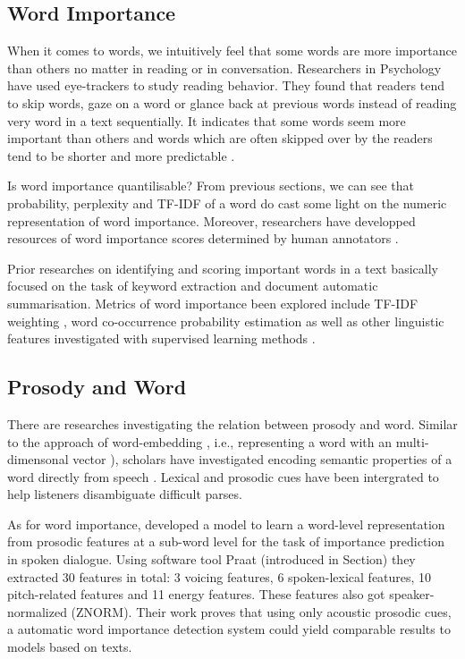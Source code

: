 \subsection{Word Importance}
When it comes to words, we intuitively feel that some words are more importance than others no matter in reading or in conversation. Researchers in Psychology have used eye-trackers to study reading behavior. They found that readers tend to skip words, gaze on a word or glance back at previous words instead of reading very word in a text sequentially. It indicates that some words seem more important than others and words which are often skipped over by the readers tend to be shorter and more predictable \citep{Rayner2011}. 

Is word importance quantilisable? From previous sections, we can see that probability, perplexity and TF-IDF of a word do cast some light on the numeric representation of word importance. Moreover, researchers have developped resources of word importance scores determined by human annotators \citep{Kafle2018}. 
 
Prior researches on identifying and scoring important words in a text basically focused on the task of keyword extraction and document automatic summarisation. Metrics of word importance been explored include TF-IDF weighting \citep{HaCohen-Kerner2010}, word co-occurrence probability estimation \citep{Y.MATSUO2004} as well as other linguistic features investigated with supervised learning methods \citep{Liu2011, I.Sheeba2012, Murdoch2018}. 

\subsection{Prosody and Word}
There are researches investigating the relation between prosody and word. Similar to the approach of word-embedding \citep{Mikolov2013}, i.e., representing a word with an multi-dimensonal vector ), scholars have investigated encoding semantic properties of a word directly from speech \citep{Chung2018}. Lexical and prosodic cues have been intergrated to help listeners disambiguate difficult parses\citep{Tran2018}.

As for word importance, \citet{Kafle2019} developed a model to learn a word-level representation from prosodic features at a sub-word level for the task of importance prediction in spoken dialogue. Using software tool Praat (introduced in Section) they extracted 30 features in total: 3 voicing features, 6 spoken-lexical features, 10 pitch-related features and 11 energy features. These features also got speaker-normalized (ZNORM). Their work proves that using only acoustic prosodic cues, a automatic word importance detection system could yield comparable results to models based on texts.

